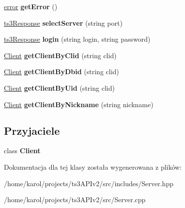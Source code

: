 \begin{DoxyCompactItemize}
\item 
\hyperlink{struct_ts3_api_1_1error}{error} {\bfseries get\+Error} ()\hypertarget{class_ts3_api_1_1_server_aaf8438c60bf85b8859d2f3cf2c0ae394}{}\label{class_ts3_api_1_1_server_aaf8438c60bf85b8859d2f3cf2c0ae394}

\item 
\hyperlink{struct_ts3_api_1_1ts3_response}{ts3\+Response} {\bfseries select\+Server} (string port)\hypertarget{class_ts3_api_1_1_server_aa7baa3564ee6d2233f9e9a7f21852b03}{}\label{class_ts3_api_1_1_server_aa7baa3564ee6d2233f9e9a7f21852b03}

\item 
\hyperlink{struct_ts3_api_1_1ts3_response}{ts3\+Response} {\bfseries login} (string login, string password)\hypertarget{class_ts3_api_1_1_server_a23702c6673e012c75f5ad884dbc90d4d}{}\label{class_ts3_api_1_1_server_a23702c6673e012c75f5ad884dbc90d4d}

\item 
\hyperlink{class_ts3_api_1_1_client}{Client} {\bfseries get\+Client\+By\+Clid} (string clid)\hypertarget{class_ts3_api_1_1_server_a99295e7a116284d1622c7313b3a50977}{}\label{class_ts3_api_1_1_server_a99295e7a116284d1622c7313b3a50977}

\item 
\hyperlink{class_ts3_api_1_1_client}{Client} {\bfseries get\+Client\+By\+Dbid} (string clid)\hypertarget{class_ts3_api_1_1_server_aac64f2aed2eab8efdd1a16e4fac75b67}{}\label{class_ts3_api_1_1_server_aac64f2aed2eab8efdd1a16e4fac75b67}

\item 
\hyperlink{class_ts3_api_1_1_client}{Client} {\bfseries get\+Client\+By\+Uid} (string clid)\hypertarget{class_ts3_api_1_1_server_abc5ed55f443f831eb6d430876e554bcc}{}\label{class_ts3_api_1_1_server_abc5ed55f443f831eb6d430876e554bcc}

\item 
\hyperlink{class_ts3_api_1_1_client}{Client} {\bfseries get\+Client\+By\+Nickname} (string nickname)\hypertarget{class_ts3_api_1_1_server_a235d7e5596be98d9dc91fa07b75edcb9}{}\label{class_ts3_api_1_1_server_a235d7e5596be98d9dc91fa07b75edcb9}

\end{DoxyCompactItemize}
\subsection*{Przyjaciele}
\begin{DoxyCompactItemize}
\item 
class {\bfseries Client}\hypertarget{class_ts3_api_1_1_server_a5db1c99e2c94b26278f3838c85cdb618}{}\label{class_ts3_api_1_1_server_a5db1c99e2c94b26278f3838c85cdb618}

\end{DoxyCompactItemize}


Dokumentacja dla tej klasy została wygenerowana z plików\+:\begin{DoxyCompactItemize}
\item 
/home/karol/projects/ts3\+A\+P\+Iv2/src/includes/Server.\+hpp\item 
/home/karol/projects/ts3\+A\+P\+Iv2/src/Server.\+cpp\end{DoxyCompactItemize}
